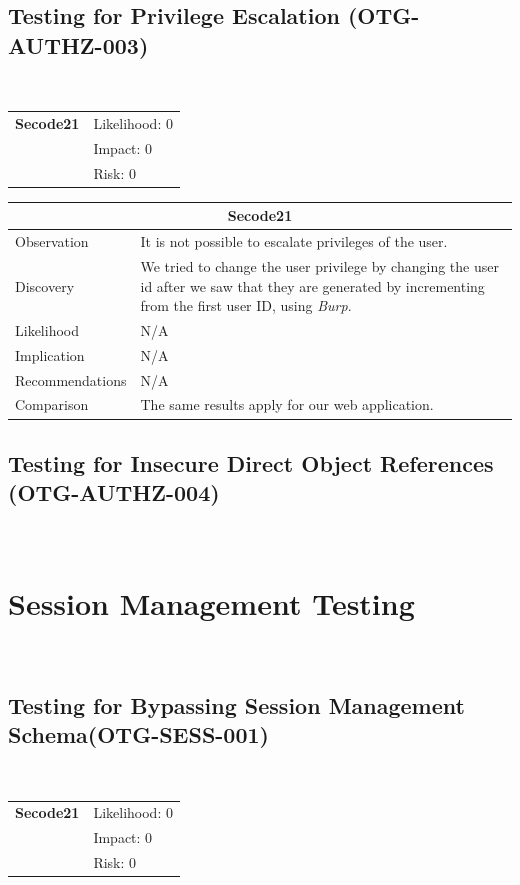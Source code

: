 \documentclass[headsepline,footsepline,footinclude=false,oneside,fontsize=11pt,paper=a4,listof=totoc,bibliography=totoc]{scrbook} %
\begin{document}
\pagebreak

\subsection{Testing for Privilege Escalation (OTG-AUTHZ-003)}\

\begin{tabular}{cR{12cm}}
	\textbf{Secode21} & Likelihood: 0\\& Impact: 0\\& Risk: 0
\end{tabular}

\begin{tabular}{ l|p{11cm}  }
	\hline
	\multicolumn{2}{c}{\textbf{Secode21}} \\
	\hline
	Observation   & It is not possible to escalate privileges of the user.  \\
	Discovery  & We tried to change the user privilege by changing the user id after we saw that they are generated by incrementing from the first user ID, using \textit{Burp}.\\
	Likelihood & N/A \\
	Implication    & N/A \\
	Recommendations & N/A \\
	Comparison & The same results apply for our web application.\\
	\hline
\end{tabular}

\pagebreak
\subsection{Testing for Insecure Direct Object References (OTG-AUTHZ-004)}\

\pagebreak
\section{Session Management Testing}\
\subsection{Testing for Bypassing Session Management Schema(OTG-SESS-001)}\

\begin{tabular}{cR{12cm}}
	\textbf{Secode21} & Likelihood: 0\\& Impact: 0\\& Risk: 0
\end{tabular}
\end{document}
